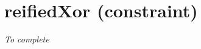 \section{reifiedXor (constraint)}\label{reifiedxor:reifiedxorconstraint}\hypertarget{reifiedxor:reifiedxorconstraint}{}
\emph{To complete}

